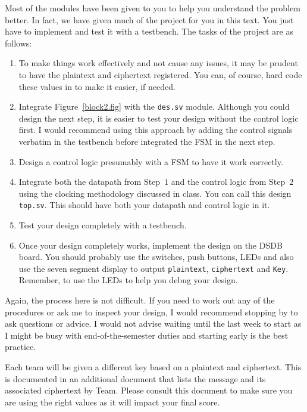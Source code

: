 \documentclass{article}
\begin{document}
Most of the modules have been given to you to help you understand the
problem better.   In fact, we have given much of the project for you
in this text.  You just have to implement and test it with a
testbench.  The tasks of the project are as follows:
\begin{enumerate}
  \item To make things work effectively and not cause any issues, it
    may be prudent to have the    
    plaintext and ciphertext registered.  You
    can, of course, hard code these values in to make it easier, if needed.
\item  Integrate Figure~\ref{block2.fig} with the \verb!des.sv!
  module.  Although you could design the next step, it is easier to
  test your design without the control logic first.  I would recommend
  using this approach by adding the control signals verbatim in the
  testbench before integrated the FSM in the next step.
\item Design a control logic presumably with a FSM to have it work
  correctly.
  \item Integrate both the datapath from Step~$1$ and the control
    logic from Step~$2$ using the clocking methodology discussed in
    class.
    You can call this design \verb!top.sv!.  This should have both your datapath
    and control logic in it.
  \item Test  your design completely with a testbench.  
  \item Once your design completely works, implement the design on
    the DSDB board.  You should probably use the switches, push
    buttons, LEDs and also use the
    seven segment display to output \verb!plaintext!, \verb!ciphertext!
    and \verb!Key!.  Remember, to use the LEDs to help you
    debug your design.      
\end{enumerate}

Again, the process here is not difficult.  If you need to work out any
of the procedures or ask me to inspect your design, I would recommend
stopping by to ask questions or advice.  I would not advise waiting
until the last week to start as I might be busy with
end-of-the-semester duties and starting early is the best practice.

Each team will be given a different key based on a plaintext and
ciphertext.  This is documented in an additional document that lists
the message and its associated ciphertext by Team.  Please consult
this document to make sure you are using the right values as it will
impact your final score.
\end{document}
